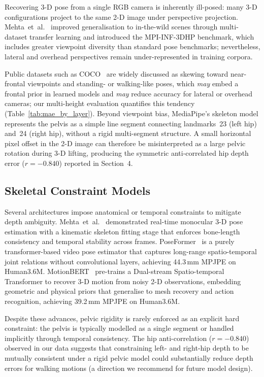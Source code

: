 \documentclass[english,fleqn]{ieej-e}
\begin{document}
Recovering 3-D pose from a single RGB camera is inherently ill-posed: many
3-D configurations project to the same 2-D image under perspective
projection. Mehta~et~al.~\cite{mehta2017} improved generalisation to
in-the-wild scenes through multi-dataset transfer learning and introduced the
MPI-INF-3DHP benchmark, which includes greater viewpoint diversity than
standard pose benchmarks; nevertheless, lateral and overhead perspectives
remain under-represented in training corpora.

Public datasets such as COCO~\cite{coco} are widely discussed as skewing
toward near-frontal viewpoints and standing- or walking-like poses, which
\emph{may} embed a frontal prior in learned models and \emph{may} reduce
accuracy for lateral or overhead cameras; our multi-height evaluation
quantifies this tendency (Table~\ref{tab:mae_by_layer}).
Beyond viewpoint bias, MediaPipe's skeleton model represents the pelvis as a
simple line segment connecting landmarks~23 (left hip) and~24 (right hip),
without a rigid multi-segment structure. A small horizontal pixel offset in
the 2-D image can therefore be misinterpreted as a large pelvic rotation
during 3-D lifting, producing the symmetric anti-correlated hip depth error
($r=-0.840$) reported in Section~4.

\subsection{Skeletal Constraint Models}

Several architectures impose anatomical or temporal constraints to mitigate
depth ambiguity. Mehta~et~al.~\cite{vnect} demonstrated real-time monocular
3-D pose estimation with a kinematic skeleton fitting stage that enforces
bone-length consistency and temporal stability across frames.
PoseFormer~\cite{poseformer} is a purely transformer-based video pose
estimator that captures long-range spatio-temporal joint relations without
convolutional layers, achieving 44.3\,mm MPJPE on Human3.6M.
MotionBERT~\cite{motionbert} pre-trains a Dual-stream Spatio-temporal
Transformer to recover 3-D motion from noisy 2-D observations, embedding
geometric and physical priors that generalise to mesh recovery and action
recognition, achieving 39.2\,mm MPJPE on Human3.6M.

Despite these advances, pelvic rigidity is rarely enforced as an explicit
hard constraint: the pelvis is typically modelled as a single segment or
handled implicitly through temporal consistency. The hip anti-correlation
($r=-0.840$) observed in our data suggests that constraining left- and
right-hip depth to be mutually consistent under a rigid pelvic model could
substantially reduce depth errors for walking motions (a direction we
recommend for future model design).
\end{document}
